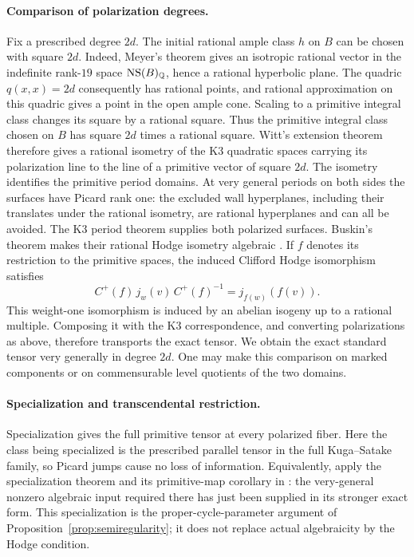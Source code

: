 \paragraph{Comparison of polarization degrees.}
Fix a prescribed degree $2d$.  The initial rational ample
class $h$ on $B$ can be chosen with square $2d$.  Indeed,
Meyer's theorem gives an isotropic rational vector in the
indefinite rank-$19$ space $\operatorname{NS}(B)_{\mathbb Q}$, hence a rational
hyperbolic plane.  The quadric $q(x,x)=2d$ consequently has
rational points, and rational approximation on this quadric
gives a point in the open ample cone.  Scaling to a primitive
integral class changes its square by a rational square.
Thus the primitive integral class chosen on $B$ has square $2d$
times a rational square.  Witt's extension theorem
therefore gives a rational isometry of the K3 quadratic
spaces carrying its polarization line to the line of
a primitive vector of square $2d$.  The isometry
identifies the primitive period domains.  At very general
periods on both sides the surfaces have Picard rank one:
the excluded wall hyperplanes, including their translates
under the rational isometry, are rational hyperplanes
and can all be avoided.  The K3 period theorem supplies
both polarized surfaces.  Buskin's theorem makes their
rational Hodge isometry algebraic \cite{Buskin}.
If $f$ denotes its restriction to the primitive spaces,
the induced Clifford Hodge isomorphism satisfies
\[
 C^+(f)\,j_w(v)\,C^+(f)^{-1}
       =j_{f(w)}(f(v)).
\]
This weight-one isomorphism is induced by an abelian
isogeny up to a rational multiple.  Composing it with
the K3 correspondence, and converting polarizations
as above, therefore transports the exact tensor.
We obtain the exact standard tensor very generally in
degree $2d$.  One may make this comparison on marked
components or on commensurable level quotients of the
two domains.

\paragraph{Specialization and transcendental restriction.}
Specialization gives the full primitive tensor at
every polarized fiber.  Here the class being specialized
is the prescribed parallel tensor in the full
Kuga--Satake family, so Picard jumps cause no loss of
information.  Equivalently, apply the specialization
theorem and its primitive-map corollary in
\cite[Theorem~1.2 and Corollary~5.5]{CKS}: the very-general nonzero
algebraic input required there has just been supplied
in its stronger exact form.  This specialization is
the proper-cycle-parameter argument of
Proposition~\ref{prop:semiregularity}; it does not
replace actual algebraicity by the Hodge condition.

